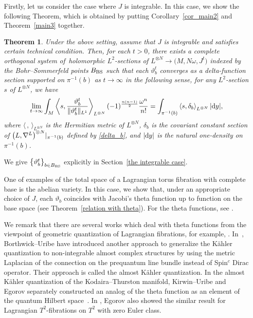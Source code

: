 \documentclass[10pt,a4paper]{amsart}
\numberwithin{equation}{section}
\newtheorem{Theorem}{Theorem}[section]
\newcommand{\abs}[1]{\lvert#1\rvert}
\newcommand{\norm}[1]{\lVert#1\rVert}
\begin{document}
Firstly, let us consider the case where $J$ is integrable. In this case, we show the following Theorem, which is obtained by putting Corollary~\ref{cor_main2} and Theorem~\ref{main3} together.
\begin{Theorem}\label{main integrable case}
Under the above setting, assume that $J$ is integrable and satisfies certain technical condition. Then, for each $t>0$, %
there exists a complete orthogonal system  of~holomorphic $L^2$-sections of $L^{\otimes N}\to \bigl(M,N\omega ,J^t\bigr)$ indexed by the Bohr--Sommerfeld points $B_{\rm BS}$ such that each $\vartheta^t_b$ converges as a delta-function section supported on $\pi^{-1}(b)$ as $t\to \infty$ in the following sense, for any $L^2$-section $s$ of $L^{\otimes N}$, we have
\begin{equation*}
\lim_{t\to \infty}\int_M\left\langle s, \frac{\vartheta^t_b}{\norm{\vartheta^t_b}_{L^1}} \right\rangle_{L^{\otimes N}} (-1)^{\frac{n(n-1)}{2}}\dfrac{\omega^n}{n!}=\int_{\pi^{-1}(b)}\left\langle s,\delta_b\right\rangle_{L^{\otimes N}} \abs{{\rm d}y},
\end{equation*}
where $\langle \, ,\, \rangle_{L^{\otimes N}}$ is the Hermitian metric of $L^{\otimes N}$, $\delta_b$ is the covariant constant section of \linebreak $\bigl(L, \smash{\nabla^L\bigr)^{\otimes N}|_{\pi^{-1}(b)}}$
defined by \eqref{delta_b}, and $\abs{{\rm d}y}$ is the natural one-density on $\pi^{-1}(b)$.
\end{Theorem}
We give $\big\{\vartheta^t_b\big\}_{b\in B_{\rm BS}}$ explicitly in Section~\ref{the integrable case}.

One of examples of the total space of a Lagrangian torus fibration with complete base is the abelian variety. In this case, we show that, under an appropriate choice of $J$, each $\vartheta_b$ coincides with Jacobi's theta function up to function on the base space (see Theorem~\ref{relation with theta}). For the theta functions, see \cite{Mumford1,Mumford3}.

We remark that there are several works which deal with theta functions from the viewpoint of geometric quantization of Lagrangian fibrations, for example, \cite{BMN,Mumford3,Nohara1, Nohara2}. In~\cite{BU}, Borthwick--Uribe have introduced another approach to generalize the K\"ahler quantization to non-integrable almost complex structures by using the metric Laplacian of the connection on the prequantum line bundle instead of Spin${}^c$ Dirac operator. Their approach is called the almost K\"ahler quantization. In the almost K\"ahler quantization of the Kodaira--Thurston manifold, Kirwin--Uribe and Egorov separately constructed an analog of the theta function as an element of the quantum Hilbert space~\cite{Egorov2,Kirwin--Uribe}. In \cite{Egorov1}, Egorov also showed the similar result for Lagrangian $T^2$-fibrations on $T^2$ with zero Euler class.
\end{document}
